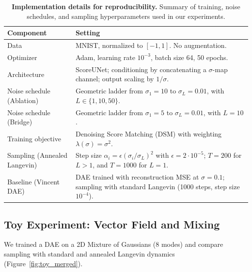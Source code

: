 \documentclass[11pt,a4paper]{article}
\begin{document}
\begin{table}[H]
\centering
\small
\setlength{\tabcolsep}{6pt}
\renewcommand{\arraystretch}{1.15}
\begin{tabular}{@{}p{} p{}@{}}
\toprule
\textbf{Component} & \textbf{Setting} \\
\midrule
Data & MNIST, normalized to $[-1,1]$. No augmentation. \\
Optimizer & Adam, learning rate $10^{-3}$, batch size 64, 50 epochs. \\
Architecture & ScoreUNet; conditioning by concatenating a $\sigma$-map channel; output scaling by $1/\sigma$. \\
Noise schedule (Ablation) & Geometric ladder from $\sigma_1=10$ to $\sigma_L=0.01$, with $L\in\{1,10,50\}$. \\
Noise schedule (Bridge) & Geometric ladder from $\sigma_1=5$ to $\sigma_L=0.01$, with $L=10$. \\
Training objective & Denoising Score Matching (DSM) with weighting $\lambda(\sigma)=\sigma^2$. \\
Sampling (Annealed Langevin) & Step size $\alpha_i=\epsilon(\sigma_i/\sigma_L)^2$ with $\epsilon=2\cdot 10^{-5}$; $T=200$ for $L>1$, and $T=1000$ for $L=1$. \\
Baseline (Vincent DAE) & DAE trained with reconstruction MSE at $\sigma=0.1$; sampling with standard Langevin (1000 steps, step size $10^{-4}$). \\
\bottomrule
\end{tabular}
\caption{\textbf{Implementation details for reproducibility.} Summary of training, noise schedules, and sampling hyperparameters used in our experiments.}
\label{tab:impl_details}
\end{table}

\subsection{Toy Experiment: Vector Field and Mixing}

We trained a DAE on a 2D Mixture of Gaussians (8 modes) and compare sampling with standard and annealed Langevin dynamics (Figure~\ref{fig:toy_merged}).
\end{document}
